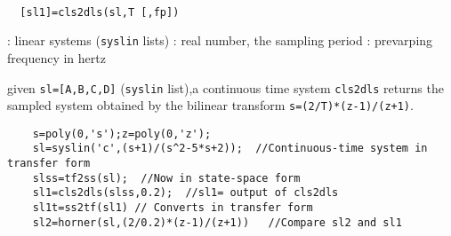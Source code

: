 \begin{mandesc}
   \\ %
\end{mandesc}
\begin{calling_sequence}
\begin{verbatim}
  [sl1]=cls2dls(sl,T [,fp])  
\end{verbatim}
\end{calling_sequence}
\begin{parameters}
  \begin{varlist}
    : linear systems (\verb!syslin! lists)
    : real number, the sampling period
    : prevarping frequency in hertz
  \end{varlist}
\end{parameters}
\begin{mandescription}
  given \verb!sl=[A,B,C,D]! (\verb!syslin! list),a continuous time system 
  \verb!cls2dls! returns the sampled system obtained by the 
  bilinear transform \verb!s=(2/T)*(z-1)/(z+1)!.
\end{mandescription}
\begin{examples}
  \begin{Verbatim}
    s=poly(0,'s');z=poly(0,'z');
    sl=syslin('c',(s+1)/(s^2-5*s+2));  //Continuous-time system in transfer form
    slss=tf2ss(sl);  //Now in state-space form
    sl1=cls2dls(slss,0.2);  //sl1= output of cls2dls
    sl1t=ss2tf(sl1) // Converts in transfer form
    sl2=horner(sl,(2/0.2)*(z-1)/(z+1))   //Compare sl2 and sl1
  \end{Verbatim}
\end{examples}
\begin{manseealso}
\end{manseealso}
